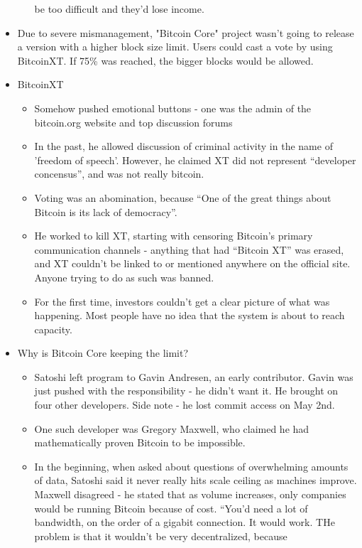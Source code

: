 \documentclass{article}
\begin{document}
\begin{itemize}
\begin{itemize}
        be too difficult and they'd lose income.
    \end{itemize}
  \item Due to severe mismanagement, "Bitcoin Core" project wasn't going to release a version with a higher block size limit.
    \subitem Users could cast a vote by using BitcoinXT. If 75\% was reached, the bigger blocks would be allowed.
  \item BitcoinXT
    \begin{itemize}
      \item Somehow pushed emotional buttons - one was the admin of the bitcoin.org website and top discussion forums
      \item In the past, he allowed discussion of criminal activity in the name of 'freedom of speech'. However, he claimed
        XT did not represent ``developer concensus'', and was not really bitcoin.
      \item Voting was an abomination, because ``One of the great things about Bitcoin is its lack of democracy''.
      \item He worked to kill XT, starting with censoring Bitcoin's primary communication channels - anything that had ``Bitcoin XT''
        was erased, and XT couldn't be linked to or mentioned anywhere on the official site. Anyone trying to do as such was banned.
      \item For the first time, investors couldn't get a clear picture of what was happening. Most people have no idea that the system is
        about to reach capacity.
    \end{itemize}
  \item Why is Bitcoin Core keeping the limit?
    \begin{itemize}
      \item Satoshi left program to Gavin Andresen, an early contributor. Gavin was just pushed with the responsibility - he didn't want it. He brought on 
        four other developers.
        \subitem Side note - he lost commit access on May 2nd.
      \item One such developer was Gregory Maxwell, who claimed he had mathematically proven Bitcoin to be impossible. 
      \item In the beginning, when asked about questions of overwhelming amounts of data, Satoshi said it never really hits scale ceiling as machines improve.
        \subitem Maxwell disagreed - he stated that as volume increases, only companies would be running Bitcoin because of cost.
        \subitem ``You'd need a lot of bandwidth, on the order of a gigabit connection. It would work. THe problem is that it wouldn't be very decentralized, because

\end{itemize}
\end{itemize}
\end{document}

